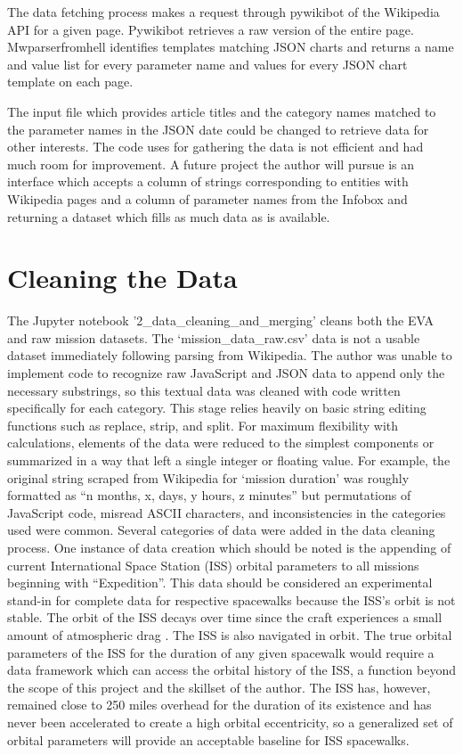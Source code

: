 \documentclass[sigconf]{acmart}
\begin{document}
The data fetching process makes a request through pywikibot \cite{Wikimedia} of the Wikipedia API for a given page. Pywikibot retrieves a raw version of the entire page. Mwparserfromhell \cite{Kurtovic2017} identifies templates matching JSON charts and returns a name and value list for every parameter name and values for every JSON chart template on each page. 

The input file which provides article titles and the category names matched to the parameter names in the JSON date could be changed to retrieve data for other interests. The code uses for gathering the data is not efficient and had much room for improvement. A future project the author will pursue is an interface which accepts a column of strings corresponding to entities with Wikipedia pages and a column of parameter names from the Infobox and returning a dataset which fills as much data as is available. 

\section{Cleaning the Data}
The Jupyter notebook '2_data_cleaning_and_merging' cleans both the EVA and raw mission datasets. The ‘mission_data_raw.csv’ data is not a usable dataset immediately following parsing from Wikipedia. The author was unable to implement code to recognize raw JavaScript and JSON data to append only the necessary substrings, so this textual data was cleaned with code written specifically for each category. This stage relies heavily on basic string editing functions such as replace, strip, and split. For maximum flexibility with calculations, elements of the data were reduced to the simplest components or summarized in a way that left a single integer or floating value. 
For example, the original string scraped from Wikipedia for ‘mission duration’ was roughly formatted as “n months, x, days, y hours, z minutes” but permutations of JavaScript code, misread ASCII characters, and inconsistencies in the categories used were common. Several categories of data were added in the data cleaning process. 
One instance of data creation which should be noted is the appending of current International Space Station (ISS) orbital parameters to all missions beginning with “Expedition”. This data should be considered an experimental stand-in for complete data for respective spacewalks because the ISS’s orbit is not stable. The orbit of the ISS decays over time since the craft experiences a small amount of atmospheric drag \cite{Hutchinson2013}. The ISS is also navigated in orbit. The true orbital parameters of the ISS for the duration of any given spacewalk would require a data framework which can access the orbital history of the ISS, a function beyond the scope of this project and the skillset of the author. The ISS has, however, remained close to 250 miles overhead for the duration of its existence and has never been accelerated to create a high orbital eccentricity, so a generalized set of orbital parameters will provide an acceptable baseline for ISS spacewalks.
\end{document}
